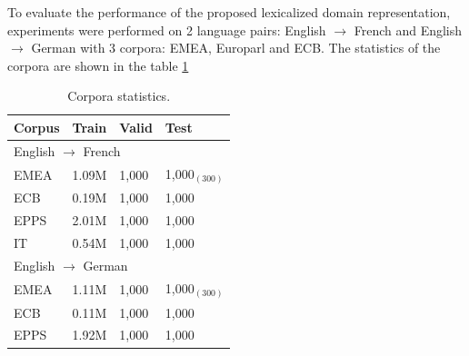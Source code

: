 \documentclass[12pt,a4paper,twoside]{report}
\theoremstyle{definition}
\begin{document}
To evaluate the performance of the proposed lexicalized domain representation, experiments were performed on 2 language pairs: English $\rightarrow$ French and English $\rightarrow$ German with 3 corpora: EMEA, Europarl and ECB. The statistics of the corpora are shown in the table \ref{tab:Corpora3}
\begin{table}[h!]
  \centering
  \begin{tabular}{ |llll|} %
    \hline
    Corpus & Train & Valid & Test \\ 
    \hline
    \multicolumn{4}{l}{English $\rightarrow$ French }\\
    \hline
    EMEA  & 1.09M & 1,000 & 1,000$_{(300)}$\\
    ECB    & 0.19M & 1,000 & 1,000     \\
    EPPS   & 2.01M  & 1,000 & 1,000  \\
    IT         & 0.54M  & 1,000 & 1,000 \\  
    \hline
    \multicolumn{4}{l}{English $\rightarrow$ German}\\
    \hline
    EMEA  & 1.11M & 1,000 & 1,000$_{(300)}$ \\
    ECB     &  0.11M & 1,000 & 1,000  \\
    EPPS   & 1.92M & 1,000 & 1,000 \\ 
    \hline
\end{tabular}
\caption{Corpora statistics.}
\label{tab:Corpora3}
\end{table}
\end{document}
